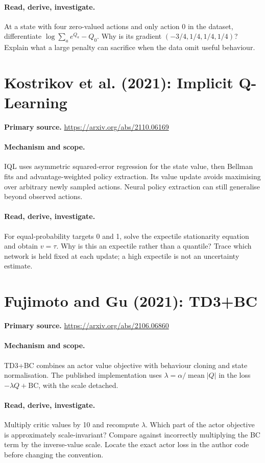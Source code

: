 \documentclass[11pt]{scrartcl}
\begin{document}
\paragraph{Read, derive, investigate.} At a state with four zero-valued actions and only action 0 in the dataset, differentiate $\log\sum_a e^{Q_a}-Q_0$. Why is its gradient $(-3/4,1/4,1/4,1/4)$? Explain what a large penalty can sacrifice when the data omit useful behaviour.

\section{Kostrikov et al. (2021): Implicit Q-Learning}
\noindent\textbf{Primary source.} \url{https://arxiv.org/abs/2110.06169}

\paragraph{Mechanism and scope.} IQL uses asymmetric squared-error regression for the state value, then Bellman fits and advantage-weighted policy extraction. Its value update avoids maximising over arbitrary newly sampled actions. Neural policy extraction can still generalise beyond observed actions.

\paragraph{Read, derive, investigate.} For equal-probability targets 0 and 1, solve the expectile stationarity equation and obtain $v=\tau$. Why is this an expectile rather than a quantile? Trace which network is held fixed at each update; a high expectile is not an uncertainty estimate.

\section{Fujimoto and Gu (2021): TD3+BC}
\noindent\textbf{Primary source.} \url{https://arxiv.org/abs/2106.06860}

\paragraph{Mechanism and scope.} TD3+BC combines an actor value objective with behaviour cloning and state normalisation. The published implementation uses $\lambda=\alpha/\operatorname{mean}|Q|$ in the loss $-\lambda Q+\mathrm{BC}$, with the scale detached.

\paragraph{Read, derive, investigate.} Multiply critic values by 10 and recompute $\lambda$. Which part of the actor objective is approximately scale-invariant? Compare against incorrectly multiplying the BC term by the inverse-value scale. Locate the exact actor loss in the author code before changing the convention.
\end{document}
